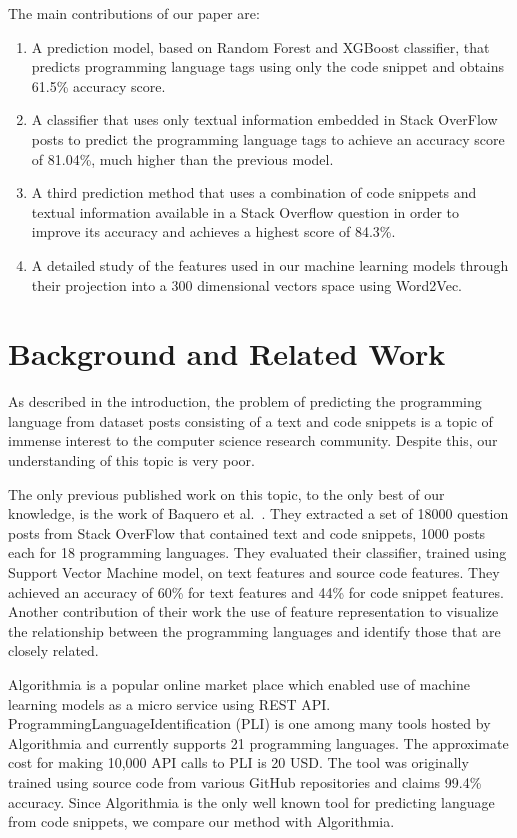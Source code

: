 \documentclass[letterpaper, 10 pt, conference]{ieeeconf}  %
\begin{document}
The main contributions of our paper are: 
\begin{enumerate}
\item
A prediction model, based on Random Forest and XGBoost classifier, that predicts programming language tags using only the code snippet and obtains 61.5\% accuracy score.
\item
A classifier that uses only textual information embedded in Stack OverFlow posts to predict the programming language tags to achieve an accuracy score of 81.04\%, much higher than the previous model.
\item 
A third prediction method that uses a combination of code snippets and textual information available in a Stack Overflow question in order to improve its accuracy and achieves a highest score of 84.3\%.
\item 
A detailed study of the features used in our machine learning models through their projection into a 300 dimensional vectors space using Word2Vec.
\end{enumerate}

\section{Background and Related Work} %
As described in the introduction, the problem of predicting the programming language from dataset posts consisting of a text and code snippets is a topic of immense interest to the computer science research community. Despite this, our understanding of this topic is very poor.
 
The only previous published work on this topic, to the only best of our knowledge, is the work of Baquero {et al.}~\cite{c18}. They extracted a set of 18000 question posts from Stack OverFlow that contained text and code snippets, 1000 posts each for 18 programming languages. They evaluated their classifier, trained using Support Vector Machine model, on text features and source code features. They achieved an accuracy of 60\% for text features and 44\% for code snippet features. Another contribution of their work the use of feature representation to visualize the relationship between the programming languages and identify those that are closely related.
 
Algorithmia is a popular online market place which enabled use of machine learning models as a micro service using REST API. ProgrammingLanguageIdentification (PLI) is one among many tools hosted by Algorithmia and currently supports 21 programming languages. The approximate cost for making 10,000 API calls to PLI is 20 USD. The tool was originally trained using source code from various GitHub repositories and claims 99.4\% accuracy. Since Algorithmia is the only well known tool for predicting language from code snippets, we compare our method with Algorithmia.
 
\end{document}
